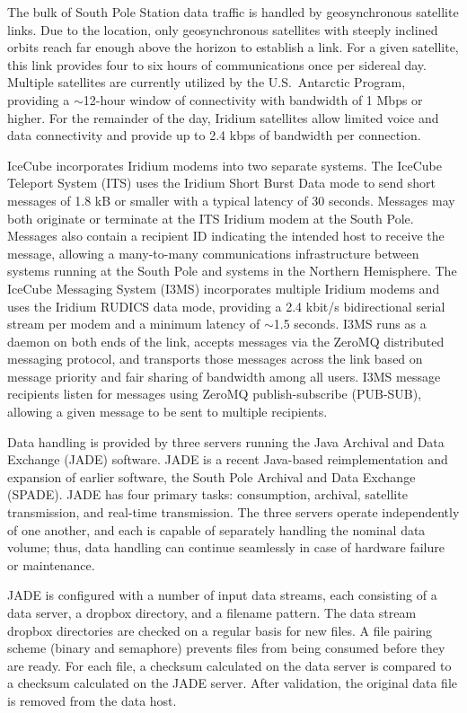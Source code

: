 The bulk of South Pole Station data traffic is handled by geosynchronous
satellite links.  Due to the location, only
geosynchronous satellites with steeply inclined orbits reach far enough
above the horizon to establish a link.  For a given satellite, this link
provides four to six hours of communications once per sidereal day.
Multiple satellites are currently utilized by the
U.S.~Antarctic Program, providing a $\sim$12-hour window of connectivity with
bandwidth of 1 Mbps or higher.  For the remainder of the day, Iridium
satellites allow limited voice and data connectivity and provide up to 2.4
kbps of bandwidth per connection.

IceCube incorporates Iridium modems into two separate systems.  The IceCube
Teleport System (ITS) uses the Iridium Short Burst Data mode to send short
messages of 1.8 kB or smaller with a typical latency of 30 seconds.
Messages may both originate or terminate at the ITS Iridium modem at the
South Pole.  Messages also contain a recipient ID indicating the intended
host to receive the message, allowing a many-to-many communications
infrastructure between systems running at the South Pole and systems in the
Northern Hemisphere.  The IceCube Messaging System (I3MS) incorporates
multiple Iridium modems and uses the Iridium RUDICS data mode, providing a
2.4 kbit/s bidirectional serial stream per modem and a minimum latency of
$\sim$1.5 seconds.  I3MS runs as a daemon on both ends of the link, accepts
messages via the ZeroMQ distributed messaging protocol, and transports
those messages across the link based on message priority and fair sharing
of bandwidth among all users. I3MS message recipients listen for messages
using ZeroMQ publish-subscribe (PUB-SUB), allowing a given message to be
sent to multiple recipients.

Data handling is provided by three servers running the Java Archival and
Data Exchange (JADE) software. JADE is a
recent Java-based reimplementation and expansion of earlier software, the
South Pole Archival and Data Exchange (SPADE).  JADE has 
four primary tasks: consumption, archival, satellite transmission, and
real-time transmission. The three servers operate independently of one
another, and each is capable of separately handling the nominal
data volume; thus, data handling can continue seamlessly in case of
hardware failure or maintenance. 

JADE is configured with a number of input data streams, 
each consisting of a data server, a dropbox directory, and a filename pattern.  The
data stream dropbox directories are checked on a regular basis for new
files. A file pairing scheme (binary and semaphore) prevents files from
being consumed before they are ready. For each file, a
checksum calculated on the data server is compared to a checksum calculated
on the JADE server.  After validation, the original data file is removed
from the data host. 

